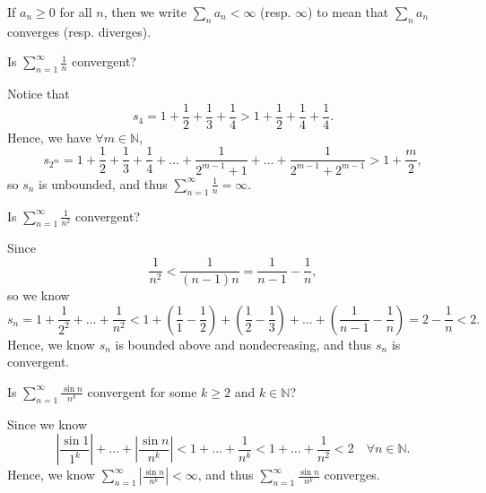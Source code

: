 \begin{notation}
    If \(a_n \ge 0\) for all \(n\), then we write \(\sum_{n} a_n < \infty  \) (resp. \(\infty \)) to mean that \(\sum_{n} a_n \) converges (resp. diverges).  
\end{notation}

\begin{eg}
    Is \(\sum_{n=1}^{\infty} \frac{1}{n} \) convergent?
\end{eg}
\begin{explanation}
    Notice that
    \[
        s_4 = 1+ \frac{1}{2} + \frac{1}{3} + \frac{1}{4} > 1 + \frac{1}{2} + \frac{1}{4} + \frac{1}{4}.
    \] 
    Hence, we have \(\forall m \in \mathbb{N} \),
    \[
        s_{2^m} = 1+ \frac{1}{2} + \frac{1}{3} + \frac{1}{4} + \dots + \frac{1}{2^{m-1} + 1} + \dots + \frac{1}{2^{m-1} + 2^{m-1}} > 1 + \frac{m}{2},
    \] so \(s_n\) is unbounded, and thus \(\sum_{n=1}^{\infty} \frac{1}{n} = \infty  \).  
\end{explanation}

\begin{eg}
    Is \(\sum_{n=1}^{\infty} \frac{1}{n^2} \) convergent? 
\end{eg}
\begin{explanation}
    Since 
    \[
        \frac{1}{n^2} < \frac{1}{(n-1)n} = \frac{1}{n-1} - \frac{1}{n},
    \] so we know
    \[
        s_n = 1 + \frac{1}{2^2} + \dots + \frac{1}{n^2} < 1 + \left( \frac{1}{1} - \frac{1}{2} \right) + \left( \frac{1}{2} - \frac{1}{3} \right) + \dots + \left( \frac{1}{n-1} - \frac{1}{n} \right) = 2 - \frac{1}{n} < 2.   
    \]
    Hence, we know \(s_n\) is bounded above and nondecreasing, and thus \(s_n\) is convergent.  
\end{explanation}

\begin{eg}
    Is \(\sum_{n=1}^{\infty} \frac{\sin n}{n^k} \) convergent for some \(k \ge 2\) and \(k \in \mathbb{N} \)?   
\end{eg}

\begin{explanation}
    Since we know 
    \[
        \left\vert \frac{\sin 1}{1^k} \right\vert + \dots + \left\vert \frac{\sin n}{n^k} \right\vert < 1 + \dots + \frac{1}{n^k} < 1 + \dots + \frac{1}{n^2} < 2 \quad \forall n \in \mathbb{N}. 
    \]
    Hence, we know \(\sum_{n=1}^{\infty} \left\vert \frac{\sin n}{n^k} \right\vert < \infty \), and thus \(\sum_{n=1}^{\infty} \frac{\sin n}{n^k} \) converges. 
\end{explanation}

